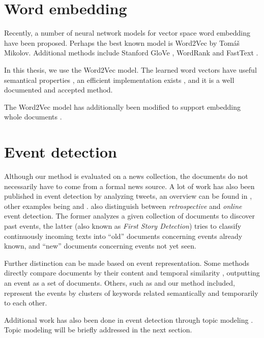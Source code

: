 \section{Word embedding}
Recently, a number of neural network models for vector space word embedding have been proposed. Perhaps the best known model is Word2Vec \citep{word2vec} by Tomáš Mikolov. Additional methods include Stanford GloVe \citep{glove}, WordRank \citep{wordrank} and FastText \citep{fasttext}.

In this thesis, we use the Word2Vec model. The learned word vectors have useful semantical properties \citep{distributed-representations, linguistic-regularities}, an efficient implementation exists \citep{gensim}, and it is a well documented and accepted method.

The Word2Vec model has additionally been modified to support embedding whole documents \citep{doc2vec}.

\section{Event detection} \label{sec:related-event-detection}
Although our method is evaluated on a news collection, the documents do not necessarily have to come from a formal news source. A lot of work has also been published in event detection by analyzing tweets, an overview can be found in \cite{twitter-survey}, other examples being \cite{ifrim} and \cite{brigadir}. \cite{twitter-survey} also distinguish between \textit{retrospective} and \textit{online} event detection. The former analyzes a given collection of documents to discover past events, the latter (also known as \textit{First Story Detection}) tries to classify continuously incoming texts into ``old'' documents concerning events already known, and ``new'' documents concerning events not yet seen.

Further distinction can be made based on event representation. Some methods directly compare documents by their content and temporal similarity \citep{document-bursty-representation}, outputting an event as a set of documents. Others, such as \cite{parameter-free, event-detection, health-events} and our method included, represent the events by clusters of keywords related semantically and temporarily to each other.

Additional work has also been done in event detection through topic modeling \citep{chaney, keane}. Topic modeling will be briefly addressed in the next section.

